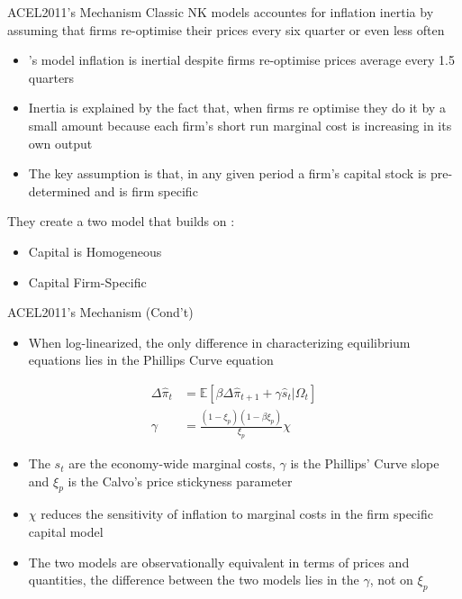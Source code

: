 \documentclass[11pt]{beamer}
\begin{document}

\begin{frame}{ACEL2011's Mechanism}
    Classic NK models accountes for inflation inertia by assuming that firms re-optimise their prices every six quarter or even less often
    \begin{itemize}
        \item \citet{ACEL2011}'s model inflation is inertial despite firms re-optimise prices average every 1.5 quarters
        \item Inertia is explained by the fact that, when firms re optimise they do it by a small amount because each firm's short run marginal cost is increasing in its own output
        \item The key assumption is that, in any given period a firm's capital stock is pre-determined and is firm specific
    \end{itemize}

    \vspace{0.5cm}
    They create a two model that builds on \citet{CEE2005}: 
    \begin{itemize}
        \item Capital is Homogeneous
        \item Capital Firm-Specific
    \end{itemize}
\end{frame}


\begin{frame}{ACEL2011's Mechanism (Cond't)}
\begin{itemize}
    \item When log-linearized, the only difference in characterizing equilibrium equations lies in the Phillips Curve equation
\end{itemize}

\begin{align}
    \Delta\hat{\pi}_t &= \mathbb{E} [\beta\Delta\hat{\pi}_{t+1} + \gamma\hat{s}_t|\Omega_t] 
    \label{eq:Phillips_Curve}
    \\
    \gamma &= \frac{(1-\xi_p)(1-\beta\xi_p)}{\xi_p}\chi 
    \label{eq:Phillips_Curve_Slope}
\end{align}

\begin{itemize}
    \item The $s_t$ are the economy-wide marginal costs, $\gamma$ is the Phillips' Curve slope and $\xi_p$ is the Calvo's price stickyness parameter
    \item $\chi$ reduces the sensitivity of inflation to marginal costs in the firm specific capital model
    \item The two models are observationally equivalent in terms of prices and quantities, the difference between the two models lies in the $\gamma$, not on $\xi_p$
\end{itemize}
\end{frame}
\end{document}
